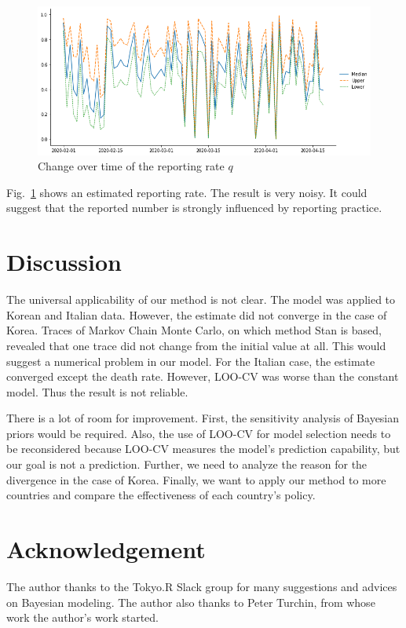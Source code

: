 \documentclass{amsart}
\begin{document}
\begin{figure}[h]
 \centering
 \includegraphics[width=\linewidth]{fig/q-Japan.png}
 \caption{Change over time of the reporting rate $q$}
 \label{fig:q}
\end{figure}

Fig.~\ref{fig:q} shows an estimated reporting rate.
The result is very noisy.
It could suggest that the reported number is strongly influenced by reporting practice.

\section{Discussion}

The universal applicability of our method is not clear.
The model was applied to Korean and Italian data.
However, the estimate did not converge in the case of Korea.
Traces of Markov Chain Monte Carlo, on which method Stan is based, revealed that one trace did not change from the initial value at all.
This would suggest a numerical problem in our model.
For the Italian case, the estimate converged except the death rate.
However, LOO-CV was worse than the constant model. Thus the result is not reliable.

There is a lot of room for improvement.
First, the sensitivity analysis of Bayesian priors would be required.
Also, the use of LOO-CV for model selection needs to be reconsidered because LOO-CV measures the model's prediction capability, but our goal is not a prediction.
Further, we need to analyze the reason for the divergence in the case of Korea.
Finally, we want to apply our method to more countries and compare the effectiveness of each country's policy. 

\section*{Acknowledgement}

The author thanks to the Tokyo.R Slack group for many suggestions and advices on Bayesian modeling.
The author also thanks to Peter Turchin, from whose work the author's work started.



\end{document}
